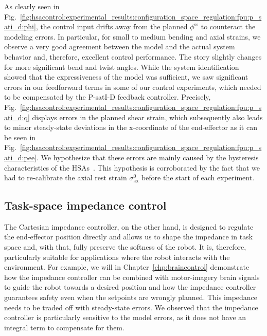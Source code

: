 As clearly seen in Fig.~\ref{fig:hsacontrol:experimental_results:configuration_space_regulation:fpu:p_sati_d:phi}, the control input drifts away from the planned $\phi^\mathrm{ss}$ to counteract the modeling errors.
In particular, for small to medium bending and axial strains, we observe a very good agreement between the model and the actual system behavior and, therefore, excellent control performance. 
The story slightly changes for more significant bend and twist angles. While the system identification showed that the expressiveness of the model was sufficient, we saw significant errors in our feedforward terms in some of our control experiments, which needed to be compensated by the P-satI-D feedback controller. Precisely, Fig.~\ref{fig:hsacontrol:experimental_results:configuration_space_regulation:fpu:p_sati_d:q} displays errors in the planned shear strain, which subsequently also leads to minor steady-state deviations in the x-coordinate of the end-effector as it can be seen in Fig.~\ref{fig:hsacontrol:experimental_results:configuration_space_regulation:fpu:p_sati_d:pee}. We hypothesize that these errors are mainly caused by the hysteresis characteristics of the \glspl{HSA}~\citep{good2022expanding}. This hypothesis is corroborated by the fact that we had to re-calibrate the axial rest strain $\sigma_\mathrm{ax}^0$ before the start of each experiment.

\subsection{Task-space impedance control}
The Cartesian impedance controller, on the other hand, is designed to regulate the end-effector position directly and allows us to shape the impedance in task space and, with that, fully preserve the softness of the robot.
It is, therefore, particularly suitable for applications where the robot interacts with the environment. For example, we will in Chapter~\ref{chp:braincontrol} demonstrate how the impedance controller can be combined with motor-imagery brain signals to guide the robot towards a desired position and how the impedance controller guarantees safety even when the setpoints are wrongly planned.
This impedance needs to be traded off with steady-state errors. We observed that the impedance controller is particularly sensitive to the model errors, as it does not have an integral term to compensate for them.

